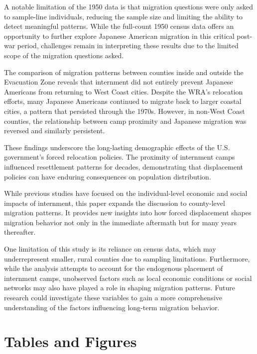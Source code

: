 \documentclass[12pt]{article}
\begin{document}
A notable limitation of the 1950 data is that migration questions were only asked to sample-line individuals, reducing the sample size and limiting the ability to detect meaningful patterns. While the full-count 1950 census data offers an opportunity to further explore Japanese American migration in this critical post-war period, challenges remain in interpreting these results due to the limited scope of the migration questions asked.

The comparison of migration patterns between counties inside and outside the Evacuation Zone reveals that internment did not entirely prevent Japanese Americans from returning to West Coast cities. Despite the WRA’s relocation efforts, many Japanese Americans continued to migrate back to larger coastal cities, a pattern that persisted through the 1970s. However, in non-West Coast counties, the relationship between camp proximity and Japanese migration was reversed and similarly persistent.

These findings underscore the long-lasting demographic effects of the U.S. government's forced relocation policies. The proximity of internment camps influenced resettlement patterns for decades, demonstrating that displacement policies can have enduring consequences on population distribution.

While previous studies have focused on the individual-level economic and social impacts of internment, this paper expands the discussion to county-level migration patterns. It provides new insights into how forced displacement shapes migration behavior not only in the immediate aftermath but for many years thereafter.

One limitation of this study is its reliance on census data, which may underrepresent smaller, rural counties due to sampling limitations. Furthermore, while the analysis attempts to account for the endogenous placement of internment camps, unobserved factors such as local economic conditions or social networks may also have played a role in shaping migration patterns. Future research could investigate these variables to gain a more comprehensive understanding of the factors influencing long-term migration behavior.

\newpage



\section*{Tables and Figures}

\end{document}

